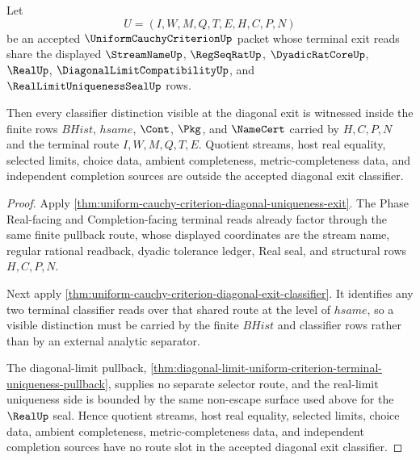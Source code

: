 \begin{theorem}
\label{thm:uniform-cauchy-criterion-diagonal-exit-nonescape}
Let
$$
U=(I,W,M,Q,T,E,H,C,P,N)
$$
be an accepted $\UniformCauchyCriterionUp$ packet whose terminal exit reads share the displayed $\StreamNameUp$, $\RegSeqRatUp$, $\DyadicRatCoreUp$, $\RealUp$, $\DiagonalLimitCompatibilityUp$, and $\RealLimitUniquenessSealUp$ rows.

Then every classifier distinction visible at the diagonal exit is witnessed inside the finite rows $BHist$, $hsame$, $\Cont$, $\Pkg$, and $\NameCert$ carried by $H,C,P,N$ and the terminal route $I,W,M,Q,T,E$. Quotient streams, host real equality, selected limits, choice data, ambient completeness, metric-completeness data, and independent completion sources are outside the accepted diagonal exit classifier.
\end{theorem}
\begin{proof}
Apply \autoref{thm:uniform-cauchy-criterion-diagonal-uniqueness-exit}. The Phase Real-facing and Completion-facing terminal reads already factor through the same finite pullback route, whose displayed coordinates are the stream name, regular rational readback, dyadic tolerance ledger, Real seal, and structural rows $H,C,P,N$.

Next apply \autoref{thm:uniform-cauchy-criterion-diagonal-exit-classifier}. It identifies any two terminal classifier reads over that shared route at the level of $hsame$, so a visible distinction must be carried by the finite $BHist$ and classifier rows rather than by an external analytic separator.

The diagonal-limit pullback, \autoref{thm:diagonal-limit-uniform-criterion-terminal-uniqueness-pullback}, supplies no separate selector route, and the real-limit uniqueness side is bounded by the same non-escape surface used above for the $\RealUp$ seal. Hence quotient streams, host real equality, selected limits, choice data, ambient completeness, metric-completeness data, and independent completion sources have no route slot in the accepted diagonal exit classifier.
\end{proof}

